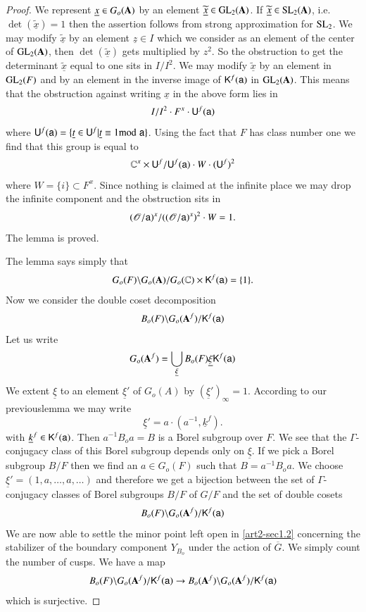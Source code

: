 \begin{proof}
We represent $\underline{x}\in G_{o}(\mathbf{A})$ by an element $\widetilde{\underline{x}}\in \mathrm{GL}_{2}(\mathbf{A})$. If $\widetilde{\underline{x}}\in \mathrm{SL}_{2}(\mathbf{A})$, i.e. $\det(\widetilde{\underline{x}})=1$ then the assertion follows from strong approximation for $\mathrm{SL}_{2}$. We may modify $\widetilde{\underline{x}}$ by an element $\underline{z}\in I$ which we consider as an element of the center of $\mathrm{GL}_{2}(\mathbf{A})$, then $\det(\widetilde{\underline{x}})$ gets multiplied by $z^{2}$. So the obstruction to get the determinant $\widetilde{\underline{x}}$ equal to one sits in $I/I^{2}$. We may modify $\widetilde{\underline{x}}$ by an element in $\mathrm{GL}_{2}(F)$ and by an element in the inverse image of $\mathsf{K}^{f}(\mathsf{a})$ in $\mathrm{GL}_{2}(\mathbf{A})$. This means that the obstruction against writing $\underline{x}$ in the above form lies in
$$
I/I^{2}\cdot F^{x}\cdot \mathsf{U}^{f}(\mathsf{a})
$$
where $\mathsf{U}^{f}(\mathsf{a})=\{\underline{t}\in \mathsf{U}^{f}|\underline{t}\equiv 1{\rm{mod}}\kern.3em \mathsf{a}\}$. Using the fact that $F$ has class number one we find that this group is equal to
$$
\mathbb{C}^{x}\times \mathsf{U}^{f}/\mathsf{U}^{f}(\mathsf{a})\cdot W\cdot (\mathsf{U}^{f})^{2}
$$
where $W=\{i\}\subset F^{x}$. Since nothing is claimed at the infinite place we may drop the infinite component and the obstruction sits in 
$$
(\mathscr{O}/\mathsf{a})^{x}/((\mathscr{O}/\mathsf{a})^{x})^{2}\cdot W=1.
$$ 
The lemma is proved.

The lemma says simply that
$$
G_{o}(F)\backslash G_{o}(\mathbf{A})/G_{o}(\mathbb{C})\times \mathsf{K}^{f}(\mathsf{a})=\{1\}.
$$
Now we consider the double coset decomposition
$$
B_{o}(F)\backslash G_{o}(\mathbf{A}^{f})/\mathsf{K}^{f}(\mathsf{a})
$$
Let us write
$$
G_{o}(\mathbf{A}^{f})=\bigcup\limits_{\underline{\xi}}B_{o}(F)\underline{\xi}\mathsf{K}^{f}(\mathsf{a})
$$
We extent $\underline{\xi}$ to an element $\underline{\xi}'$ of $G_{o}(A)$ by $(\underline{\xi}')_{\infty}=1$. According to our previous\pageoriginale lemma we may write
$$
\underline{\xi}'=a\cdot (a^{-1},\underline{k}^{f}).
$$
with $\underline{k}^{f}\in \mathsf{K}^{f}(\mathsf{a})$. Then $a^{-1}B_{o}a=B$ is a Borel subgroup over $F$. We see that the $\Gamma$-conjugacy class of this Borel subgroup depends only on $\underline{\xi}$. If we pick a Borel subgroup $B/F$ then we find an $a\in G_{o}(F)$ such that $B=a^{-1}B_{o}a$. We choose $\underline{\xi}'=(1,a,\ldots,a,\ldots)$ and therefore we get a bijection between the set of $\Gamma$-conjugacy classes of Borel subgroups $B/F$ of $G/F$ and the set of double cosets
$$
B_{o}(F)\backslash G_{o}(\mathbf{A}^{f})/\mathsf{K}^{f}(\mathsf{a})
$$
We are now able to settle the minor point left open in \ref{art2-sec1.2} concerning the stabilizer of the boundary component $Y_{B_{o}}$ under the action of $\overline{G}$. We simply count the number of cusps. We have a map
$$
B_{o}(F)\backslash G_{o}(\mathbf{A}^{f})/\mathsf{K}^{f}(\mathsf{a})\to B_{o}(\mathbf{A}^{f})\backslash G_{o}(\mathbf{A}^{f})/\mathsf{K}^{f}(\mathsf{a})
$$
which is surjective.


\end{proof}
